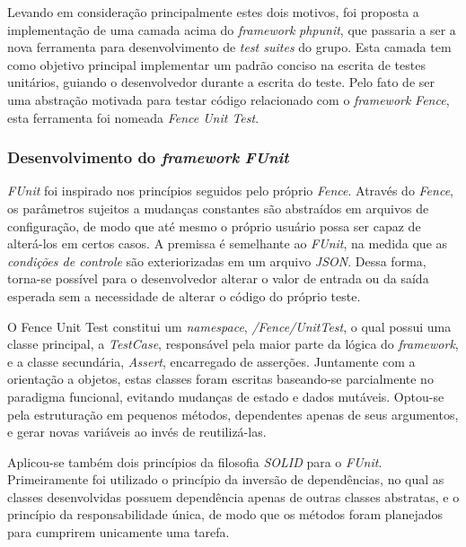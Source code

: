 Levando em consideração principalmente estes dois motivos, foi proposta a implementação de uma camada acima do \emph{framework} \emph{phpunit}, que passaria a ser a nova ferramenta para desenvolvimento de \emph{test suites} do grupo. Esta camada tem como objetivo principal implementar um padrão conciso na escrita de testes unitários, guiando o desenvolvedor durante a escrita do teste. Pelo fato de ser uma abstração motivada para testar código relacionado com o \emph{framework} \emph{Fence}, esta ferramenta foi nomeada \emph{Fence Unit Test}.

\hypertarget{desenvolvimento-do-framework-funit}{%
\subsubsection{\texorpdfstring{Desenvolvimento do \emph{framework} \emph{FUnit}}{Desenvolvimento do framework FUnit}}\label{desenvolvimento-do-framework-funit}}

\emph{FUnit} foi inspirado nos princípios seguidos pelo próprio \emph{Fence}. Através do \emph{Fence}, os parâmetros sujeitos a mudanças constantes são abstraídos em arquivos de configuração, de modo que até mesmo o próprio usuário possa ser capaz de alterá-los em certos casos. A premissa é semelhante ao \emph{FUnit}, na medida que as \emph{condições de controle} são exteriorizadas em um arquivo \emph{JSON}. Dessa forma, torna-se possível para o desenvolvedor alterar o valor de entrada ou da saída esperada sem a necessidade de alterar o código do próprio teste.

O Fence Unit Test constitui um \emph{namespace}, \emph{/Fence/UnitTest}, o qual possui uma classe principal, a \emph{TestCase}, responsável pela maior parte da lógica do \emph{framework}, e a classe secundária, \emph{Assert}, encarregado de asserções. Juntamente com a orientação a objetos, estas classes foram escritas baseando-se parcialmente no paradigma funcional, evitando mudanças de estado e dados mutáveis. Optou-se pela estruturação em pequenos métodos, dependentes apenas de seus argumentos, e gerar novas variáveis ao invés de reutilizá-las.

Aplicou-se também dois princípios da filosofia \emph{SOLID} para o \emph{FUnit}. Primeiramente foi utilizado o princípio da inversão de dependências, no qual as classes desenvolvidas possuem dependência apenas de outras classes abstratas, e o princípio da responsabilidade única, de modo que os métodos foram planejados para cumprirem unicamente uma tarefa.

